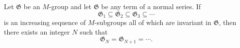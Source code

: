 Let $\mathfrak{G}$ be an $M$-group and let $\mathfrak{G}$ be any term of a normal series. If
\[
\mathfrak{G}_1 \subseteq \mathfrak{G}_2 \subseteq \mathfrak{G}_3 \subseteq \cdots
\]
is an increasing sequence of $M$-subgroups all of which are invariant in $\mathfrak{G}$, then there exists an integer $N$ such that
\[
\mathfrak{G}_N = \mathfrak{G}_{N+1} = \cdots.
\]
